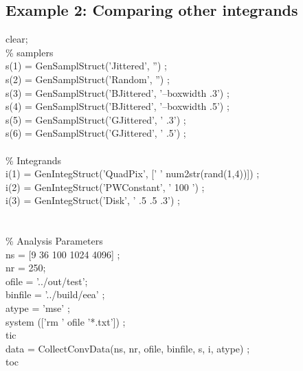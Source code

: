 \subsection{Example 2: Comparing other integrands}\label{sec:explotint}
\begin{tcolorbox}
clear; \\
\%  samplers  \\
s(1) = GenSamplStruct('Jittered', '') ; \\
s(2) = GenSamplStruct('Random', '') ; \\
s(3) = GenSamplStruct('BJittered', '--boxwidth .3') ;\\
s(4) = GenSamplStruct('BJittered', '--boxwidth .5') ;\\
s(5) = GenSamplStruct('GJittered', ' .3') ;\\
s(6) = GenSamplStruct('GJittered', ' .5') ;\\
\\
\%  Integrands\\
i(1) = GenIntegStruct('QuadPix', [' ' num2str(rand(1,4))]) ;\\
i(2) = GenIntegStruct('PWConstant', ' 100 ') ;\\
i(3) = GenIntegStruct('Disk', ' .5 .5  .3') ;\\
\\
\\
\% Analysis Parameters\\
ns = [9 36 100 1024 4096] ;\\
nr =  250;\\
ofile = '../out/test';\\
binfile = '../build/eea' ;\\
atype = 'mse' ;\\

system (['rm ' ofile '*.txt']) ;\\
tic\\
data = CollectConvData(ns, nr, ofile, binfile, s, i, atype) ;\\
toc
\end{tcolorbox}

